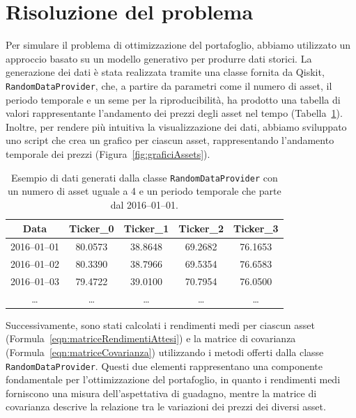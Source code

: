 \section{Risoluzione del problema}\label{sec:qiskit}

Per simulare il problema di ottimizzazione del portafoglio, 
abbiamo utilizzato un approccio basato su un modello generativo 
per produrre dati storici. La generazione dei dati è stata 
realizzata tramite una classe fornita da Qiskit, \texttt{RandomDataProvider}, 
che, a partire da parametri come il numero di asset, il 
periodo temporale e un seme per la riproducibilità, ha 
prodotto una tabella di valori rappresentante l'andamento dei 
prezzi degli asset nel tempo (Tabella~\ref{tab:dati-tickers}). 
Inoltre, per rendere più intuitiva la visualizzazione dei dati, 
abbiamo sviluppato uno script che crea un grafico per ciascun asset, 
rappresentando l'andamento temporale dei prezzi (Figura~\ref{fig:graficiAssets}).

\begin{table}[h]
    \centering
    \renewcommand{\arraystretch}{1.5}
    \begin{tabular}{|c|c|c|c|c|}
    \hline
    \textbf{Data} & \textbf{Ticker\_0} & \textbf{Ticker\_1} & \textbf{Ticker\_2} & \textbf{Ticker\_3} \\
    \hline
    2016--01--01 & 80.0573 & 38.8648 & 69.2682 & 76.1653 \\
    \hline
    2016--01--02 & 80.3390 & 38.7966 & 69.5354 & 76.6583 \\
    \hline
    2016--01--03 & 79.4722 & 39.0100 & 70.7954 & 76.0500 \\
    \hline
    \ldots & \ldots & \ldots & \ldots & \ldots \\
    \hline
    \end{tabular}
    \caption{Esempio di dati generati dalla classe \texttt{RandomDataProvider} 
        con un numero di asset uguale a 4 e un periodo temporale che parte dal 2016--01--01.}
    \label{tab:dati-tickers}
\end{table}

Successivamente, sono stati calcolati i rendimenti medi per ciascun asset 
(Formula~\ref{eqn:matriceRendimentiAttesi}) e la matrice di covarianza 
(Formula~\ref{eqn:matriceCovarianza}) utilizzando i metodi offerti dalla 
classe \texttt{RandomDataProvider}. Questi due elementi rappresentano una 
componente fondamentale per l'ottimizzazione del portafoglio, in quanto i 
rendimenti medi forniscono una misura dell'aspettativa di guadagno, mentre 
la matrice di covarianza descrive la relazione tra le variazioni dei prezzi 
dei diversi asset.

